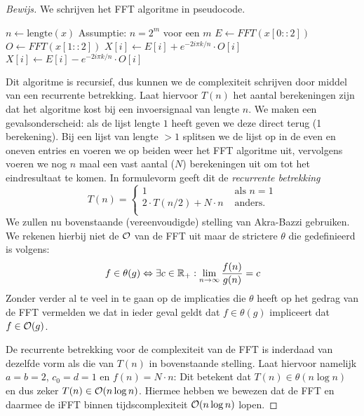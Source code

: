 \begin{proof}[Bewijs]
We schrijven het FFT algoritme in pseudocode.

\begin{algorithmic}
\State $n \gets \text{lengte}(x)$ \Comment Assumptie: $n = 2^m$ voor een $m$
\Else
	\State $E \gets FFT(x[0::2])$ 
	\State $O \gets FFT(x[1::2])$ 
			\State $X[i] \gets E[i] + e^{-2i \pi k/n} \cdot O[i]$
		\Else
			\State $X[i] \gets E[i] - e^{-2i \pi k/n} \cdot O[i]$
		\EndIf
	\EndFor
\EndIf
\State {}
\EndFunction
\end{algorithmic}

Dit algoritme is recursief, dus kunnen we de complexiteit schrijven door middel van een recurrente betrekking. Laat hiervoor $T(n)$ het aantal berekeningen zijn dat het algoritme kost bij een invoersignaal van lengte $n$. We maken een gevalsonderscheid: als de lijst lengte $1$ heeft geven we deze direct terug (1 berekening). Bij een lijst van lengte $>1$ splitsen we de lijst op in de even en oneven entries en voeren we op beiden weer het FFT algoritme uit, vervolgens voeren we nog $n$ maal een vast aantal ($N$) berekeningen uit om tot het eindresultaat te komen. In formulevorm geeft dit de \emph{recurrente betrekking}
\[
T(n) = \begin{cases}
    1 &\text{ als } n = 1 \\
    2\cdot T(n/2) + N\cdot n &\text{ anders}. \\
\end{cases}
\]
We zullen nu bovenstaande (vereenvoudigde) stelling van Akra-Bazzi gebruiken. We rekenen hierbij niet de $\mathcal{O}$ van de FFT uit maar de strictere $\theta$ die gedefinieerd is volgens:
\[
f \in \theta(g) \Leftrightarrow \exists c \in \mathbb{R}_+: \lim_{n \to \infty} \frac{f(n)}{g(n)} = c
\]
Zonder verder al te veel in te gaan op de implicaties die $\theta$ heeft op het gedrag van de FFT vermelden we dat in ieder geval geldt dat $f \in \theta(g)$ impliceert dat $f \in \mathcal{O}(g)$. 

De recurrente betrekking voor de complexiteit van de FFT is inderdaad van dezelfde vorm als die van $T(n)$ in bovenstaande stelling.
Laat hiervoor namelijk $a=b=2$, $c_0=d=1$ en $f (n) = N\cdot n$:
Dit betekent dat $T(n) \in \theta(n \log n)$ en dus zeker $T(n) \in \mathcal{O}(n \log n)$.
Hiermee hebben we bewezen dat de FFT en daarmee de iFFT binnen tijdscomplexiteit $\mathcal{O}(n\log n)$ lopen. 
\end{proof}

